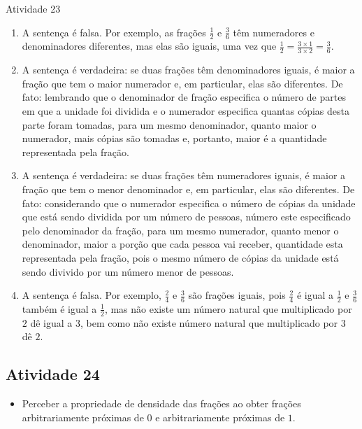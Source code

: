 \begin{multicols}{2}
\begin{resposta*}{Atividade 23}
\begin{enumerate} [\quad a)] %
    \item A sentença é falsa. Por exemplo, as frações $\frac{1}{2}$ e 
$\frac{3}{6}$ têm numeradores e denominadores diferentes, mas elas são iguais, 
uma vez que $\frac{1}{2} = \frac{3 \times 1}{3 \times 2} = \frac{3}{6}$.
    \item A sentença é verdadeira: se duas frações têm denominadores iguais, é 
maior a fração que tem o maior numerador e, em particular, elas são diferentes. 
De fato: lembrando que o denominador de fração especifica o número de partes em 
que a unidade foi dividida e o numerador especifica quantas cópias desta parte 
foram tomadas, para um mesmo denominador, quanto maior o numerador, mais cópias 
são tomadas e, portanto, maior é a quantidade representada pela fração.
    \item  A sentença é verdadeira: se duas frações têm numeradores iguais, é 
maior a fração que tem o menor denominador e, em particular, elas são 
diferentes. De fato: considerando que o numerador especifica o número de cópias 
da unidade que está sendo dividida por um número de pessoas, número este 
especificado pelo denominador da fração, para um mesmo numerador, quanto menor o 
denominador, maior a porção que cada pessoa vai receber, quantidade esta 
representada pela fração, pois o mesmo número de cópias da unidade está sendo 
divivido por um número menor de pessoas.
    \item A sentença é falsa. Por exemplo, $\frac{2}{4}$ e $\frac{3}{6}$ são 
frações iguais, pois $\frac{2}{4}$ é igual a $\frac{1}{2}$ e $\frac{3}{6}$ 
também é igual a $\frac{1}{2}$, mas não existe um número natural que 
multiplicado por $2$ dê igual a $3$, bem como não existe número natural que 
multiplicado por $3$ dê $2$.
\end{enumerate}
\end{resposta*}

\subsection{Atividade 24}

\begin{itemize} %
    \item       Perceber a propriedade de densidade das frações ao obter frações 
arbitrariamente próximas de       $0$       e arbitrariamente próximas de       
$1$.
\end{itemize} %
  

\end{multicols}
